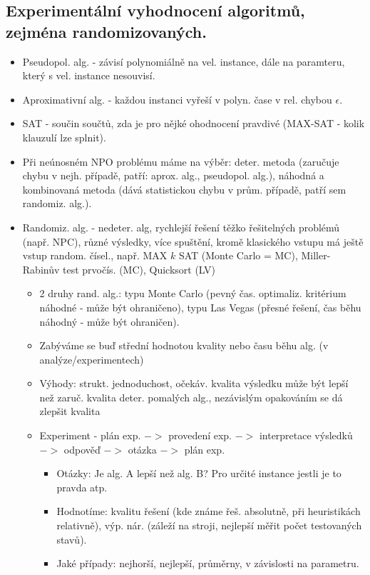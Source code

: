\documentclass[a4paper,hidelinks]{article}
\begin{document}
\subsection{Experimentální vyhodnocení algoritmů, zejména randomizovaných.}

\begin{itemize}
    \item Pseudopol. alg. - závisí polynomiálně na vel. instance, dále na paramteru, který s vel. instance nesouvisí.
    \item Aproximativní alg. - každou instanci vyřeší v polyn. čase v rel. chybou $\epsilon$.
    \item SAT - součin součtů, zda je pro nějké ohodnocení pravdivé (MAX-SAT - kolik klauzulí lze splnit).
    \item Při neúnosném NPO problému máme na výběr: deter. metoda (zaručuje chybu v nejh. případě, patří: aprox. alg., pseudopol. alg.), náhodná a kombinovaná metoda (dává statistickou chybu v prům. případě, patří sem randomiz. alg.).
     \item Randomiz. alg. - nedeter. alg, rychlejší řešení těžko řešitelných problémů (např. NPC), různé výsledky, více spuštění, kromě klasického vstupu má ještě vstup random. čísel., např. MAX $k$ SAT (Monte Carlo = MC), Miller-Rabinův test prvočís. (MC), Quicksort (LV)
     \begin{itemize}
         \item 2 druhy rand. alg.: typu Monte Carlo (pevný čas. optimaliz. kritérium náhodné - může být ohraničeno), typu Las Vegas (přesné řešení, čas běhu náhodný - může být ohraničen).
        \item Zabýváme se buď střední hodnotou kvality nebo času běhu alg. (v analýze/experimentech)
        \item Výhody: strukt. jednoduchost, očekáv. kvalita výsledku může být lepší než zaruč. kvalita deter. pomalých alg., nezávislým opakováním se dá zlepšit kvalita
        \item Experiment - plán exp. $->$ provedení exp. $->$ interpretace výsledků $->$ odpověď $->$ otázka $->$ plán exp.
        \begin{itemize}
            \item Otázky: Je alg. A lepší než alg. B? Pro určité instance jestli je to pravda atp.
            \item Hodnotíme: kvalitu řešení (kde známe řeš. absolutně, při heuristikách relativně), výp. nár. (záleží na stroji, nejlepší měřit počet testovaných stavů).
            \item Jaké případy: nejhorší, nejlepší, průměrny, v závislosti na parametru.

\end{itemize}
\end{itemize}
\end{itemize}
\end{document}
